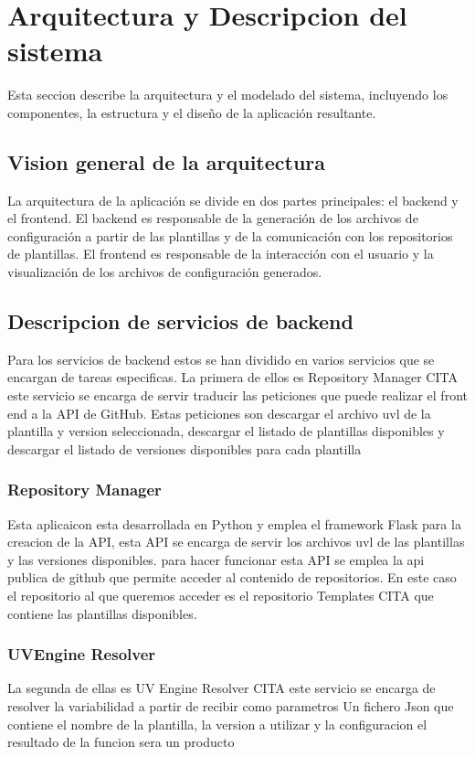 \documentclass[12pt, a4paper, twoside]{article}
\begin{document}
\section{Arquitectura y Descripcion del sistema }
Esta seccion describe la arquitectura y el modelado del sistema, incluyendo los componentes, la estructura y el diseño de la aplicación resultante.
\subsection{Vision general de la arquitectura }
La arquitectura de la aplicación se divide en dos partes principales: el backend y el frontend.
El backend es responsable de la generación de los archivos de configuración a partir de las plantillas y de la comunicación con los repositorios de plantillas.
El frontend es responsable de la interacción con el usuario y la visualización de los archivos de configuración generados.
\subsection{Descripcion de servicios de backend}
Para los servicios de backend estos se han dividido en varios servicios que se encargan de tareas especificas.
La primera de ellos es Repository Manager CITA este servicio se encarga de servir traducir las peticiones que puede realizar el front end a la API de GitHub.
Estas peticiones son descargar el archivo uvl de la plantilla y version seleccionada, descargar el listado de plantillas disponibles y descargar el listado de versiones disponibles para cada plantilla
\subsubsection{Repository Manager}
Esta aplicaicon esta desarrollada en Python y emplea el framework Flask para la creacion de la API, esta API se encarga de servir los archivos uvl de las plantillas y las versiones disponibles.
para hacer funcionar esta API se emplea la api publica de github que permite acceder al contenido de repositorios. 
En este caso el repositorio al que queremos acceder es el repositorio Templates CITA que contiene las plantillas disponibles.
\subsubsection{UVEngine Resolver}

La segunda de ellas es UV Engine Resolver CITA este servicio se encarga de resolver la variabilidad a partir de recibir como parametros Un fichero Json que contiene el nombre de la plantilla, la version a utilizar y la configuracion 
el resultado de la funcion sera un producto
\end{document}
